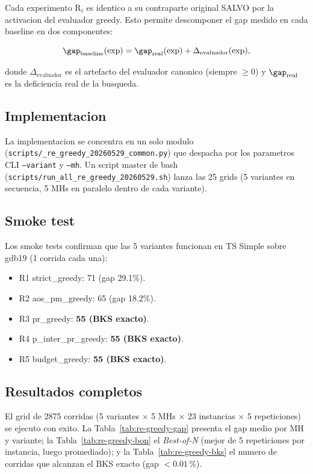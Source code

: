 Cada experimento R$_i$ es identico a su contraparte original SALVO por
la activacion del evaluador greedy. Esto permite descomponer el gap
medido en cada baseline en dos componentes:

\begin{equation}
\gap_{\text{baseline}}(\text{exp}) = \gap_{\text{real}}(\text{exp}) +
\Delta_{\text{evaluador}}(\text{exp}),
\end{equation}

donde $\Delta_{\text{evaluador}}$ es el artefacto del evaluador
canonico (siempre $\ge 0$) y $\gap_{\text{real}}$ es la deficiencia
real de la busqueda.

\subsection{Implementacion}

La implementacion se concentra en un solo modulo
(\texttt{scripts/\_re\_greedy\_20260529\_common.py}) que despacha por
los parametros CLI \texttt{--variant} y \texttt{--mh}. Un script
master de bash (\texttt{scripts/run\_all\_re\_greedy\_20260529.sh})
lanza las 25 grids (5 variantes en secuencia, 5 MHs en paralelo dentro
de cada variante).

\subsection{Smoke test}

Los smoke tests confirman que las 5 variantes funcionan en TS Simple
sobre gdb19 (1 corrida cada una):

\begin{itemize}
\item R1 strict\_greedy: 71 (gap 29.1\%).
\item R2 aos\_pm\_greedy: 65 (gap 18.2\%).
\item R3 pr\_greedy: \textbf{55 (BKS exacto)}.
\item R4 p\_inter\_pr\_greedy: \textbf{55 (BKS exacto)}.
\item R5 budget\_greedy: \textbf{55 (BKS exacto)}.
\end{itemize}

\subsection{Resultados completos}

El grid de 2875 corridas (5 variantes $\times$ 5 MHs $\times$ 23 instancias
$\times$ 5 repeticiones) se ejecuto con exito. La
Tabla~\ref{tab:re-greedy-gap} presenta el gap medio por MH y variante;
la Tabla~\ref{tab:re-greedy-bon} el \emph{Best-of-N} (mejor de 5
repeticiones por instancia, luego promediado); y la
Tabla~\ref{tab:re-greedy-bks} el numero de corridas que alcanzan el BKS
exacto (gap $< 0.01$\,\%).

